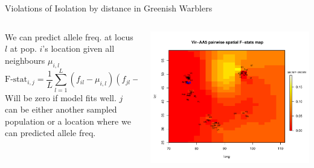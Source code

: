 \documentclass{beamer}
\begin{document}
\begin{frame}{Violations of Isolation by distance in Greenish Warblers}

\begin{columns}
\begin{column}{0.4\textwidth}
We can predict allele freq. at locus $l$ at pop. $i$'s location given all neighbours $\mu_{i,l}$
\begin{equation*}
\textrm{F-stat}_{i,j}  = \frac{1}{L} \sum_{l=1}^L  (f_{il} - \mu_{i,l} )(f_{jl}-\epsilon_l)
\end{equation*}
Will be zero if model fits well. $j$ can be either another sampled
population or a location where we can predicted allele freq.
\end{column}
\begin{column}{0.6\textwidth}
\pause 

	\begin{center} \includegraphics[width=
          0.9 \textwidth]{../smbe_spacemix_figs/fstat_map_Vir-AA5}
 \end{center}
\end{column}
\end{columns}
\end{frame}
\end{document}
